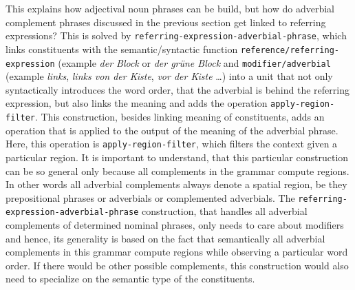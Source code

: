 This explains how adjectival noun phrases can be build, 
but how do adverbial complement phrases discussed in the 
previous section get linked to referring expressions? 
This is solved by {\footnotesize\tt referring-expression-adverbial-phrase}, 
which links constituents with the semantic/syntactic function 
{\footnotesize\tt reference/referring-expression} (example \textit{der Block} or \textit{der gr\"une Block}
and {\footnotesize\tt modifier/adverbial} (example \textit{links}, \textit{links von der Kiste}, 
\textit{vor der Kiste} \ldots) into a unit that not only syntactically introduces 
the word order, that the adverbial is behind the referring expression, 
but also links the meaning and adds the operation {\footnotesize\tt apply-region-filter}. 
This construction, besides linking meaning of constituents,
adds an operation that is applied to the output of the meaning 
of the adverbial phrase. Here, this operation is {\footnotesize\tt apply-region-filter}, which 
filters the context given a particular region. It is important to understand, 
that this particular construction can be so general only because 
all complements in the grammar compute regions. In other words all adverbial complements always denote a spatial region, be they prepositional phrases or adverbials or complemented adverbials. 
The {\footnotesize\tt referring-expression-adverbial-phrase} construction, that handles 
all adverbial complements of determined nominal phrases, only needs to care about 
modifiers and hence, its generality is based on the fact that semantically 
all adverbial complements in this grammar compute regions while observing 
a particular word order. If there would be other possible complements, this 
construction would also need to specialize on the semantic type of the constituents.



